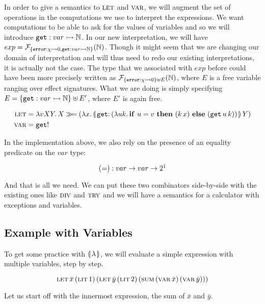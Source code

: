 In order to give a semantics to $\textsc{let}$ and $\textsc{var}$, we will augment the
set of operations in the computations we use to interpret the
expressions. We want computations to be able to ask for the values of
variables and so we will introduce $\mathtt{get} : var \rightarrowtail \mathbb{N}$. In our new
interpretation, we will have $exp =
\mathcal{F}_{\{\mathtt{error} : \chi \rightarrowtail 0,\mathtt{get} : var \rightarrowtail \mathbb{N}\}}(\mathbb{N})$. Though it
might seem that we are changing our domain of interpretation and will thus
need to redo our existing interpretations, it is actually not the case. The
type that we associated with $exp$ before could have been more precisely
written as $\mathcal{F}_{\{\mathtt{error} : \chi \rightarrowtail 0\} \uplus E}(\mathbb{N})$, where $E$ is
a free variable ranging over effect signatures. What we are doing is simply
specifying $E = \{\mathtt{get} : var \rightarrowtail \mathbb{N}\} \uplus E'$, where $E'$ is again
free.

\begin{align*}
  \lete &= \lam{v X Y}{X \hsbind
    (\lam{x}{\ap{\banana{\onto{\op{get}}{(\lam{u k}{\ifte{u = v}{(\ap{k}{x})}{(\app{\op{get}}{u}{k})}})}}}{Y}})} \\
  \vare &= \op{get}!
\end{align*}

In the implementation above, we also rely on the presence of an equality
predicate on the $var$ type:

 $$
  (=) : var \to var \to 2\footnotemark
 $$


And that is all we need. We can put these two combinators side-by-side with
the existing ones like $\textsc{div}$ and $\textsc{try}$ and we will have a semantics for
a calculator with exceptions and variables.

\subsection{Example with Variables}

To get some practice with ${\llparenthesis \, \lambda \, \rrparenthesis}$, we will evaluate a simple expression
with multiple variables, step by step.

$$
\textsc{let}\,\bar{x}\,(\textsc{lit}\,1)\,(\textsc{let}\,\bar{y}\,(\textsc{lit}\,2)\,(\textsc{sum}\,(\textsc{var}\,\bar{x})\,(\textsc{var}\,\bar{y})))
$$

Let us start off with the innermost expression, the sum of $\bar{x}$ and
$\bar{y}$.

